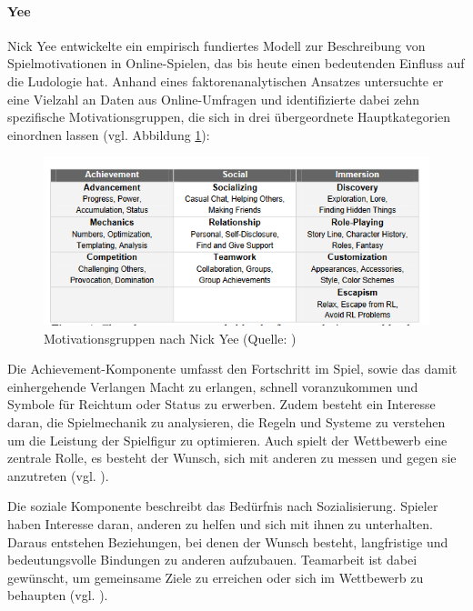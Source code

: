\paragraph{Yee}
Nick Yee entwickelte ein empirisch fundiertes Modell zur Beschreibung von Spielmotivationen in Online-Spielen, das bis heute einen bedeutenden Einfluss auf die Ludologie hat. Anhand eines faktorenanalytischen Ansatzes untersuchte er eine Vielzahl an Daten aus Online-Umfragen und identifizierte dabei zehn spezifische Motivationsgruppen, die sich in drei übergeordnete Hauptkategorien einordnen lassen (vgl. Abbildung \ref{fig:nick_yee_motivations}):

\begin{figure}[ht]
\centering
\includegraphics[width=1\linewidth]{content/pictures/nick_yee_categorizations.PNG}
\caption{Motivationsgruppen nach Nick Yee (Quelle: \citealp[S. 5]{yee_motivations_2006})}
\label{fig:nick_yee_motivations}
\end{figure}

Die Achievement-Komponente umfasst den Fortschritt im Spiel, sowie das damit einhergehende Verlangen Macht zu erlangen, schnell voranzukommen und Symbole für Reichtum oder Status zu erwerben. Zudem besteht ein Interesse daran, die Spielmechanik zu analysieren, die Regeln und Systeme zu verstehen um die Leistung der Spielfigur zu optimieren. Auch spielt der Wettbewerb eine zentrale Rolle, es besteht der Wunsch, sich mit anderen zu messen und gegen sie anzutreten (vgl. \citealp[S. 5]{yee_motivations_2006}).

Die soziale Komponente beschreibt das Bedürfnis nach Sozialisierung. Spieler haben Interesse daran, anderen zu helfen und sich mit ihnen zu unterhalten. Daraus entstehen Beziehungen, bei denen der Wunsch besteht, langfristige und bedeutungsvolle Bindungen zu anderen aufzubauen. Teamarbeit ist dabei gewünscht, um gemeinsame Ziele zu erreichen oder sich im Wettbewerb zu behaupten (vgl. \citealp[S. 6]{yee_motivations_2006}).

